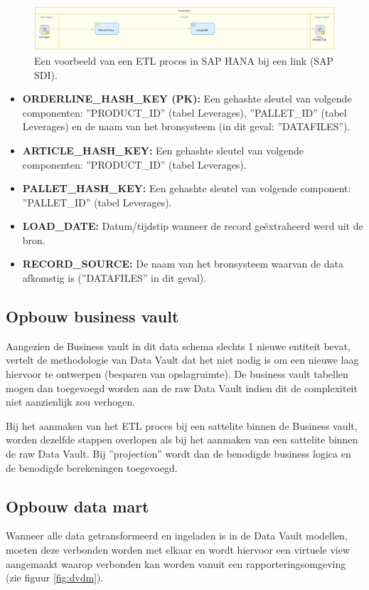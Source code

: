 \begin{figure}[h]
	\centering
	\includegraphics[scale=0.45]{../images/DV_FG_link.png}
	\caption{Een voorbeeld van een ETL proces in SAP HANA bij een link (SAP SDI).}
	\label{fig:etllink}
\end{figure}

\begin{itemize}
	\item \textbf{ORDERLINE\_HASH\_KEY (PK):} Een gehashte sleutel van volgende componenten: ''PRODUCT\_ID'' (tabel Leverages), ''PALLET\_ID'' (tabel Leverages)  en de naam van het bronsysteem (in dit geval: ''DATAFILES'').
	\item \textbf{ARTICLE\_HASH\_KEY:} Een gehashte sleutel van volgende componenten: ''PRODUCT\_ID'' (tabel Leverages).
	\item \textbf{PALLET\_HASH\_KEY:} Een gehashte sleutel van volgende component: ''PALLET\_ID'' (tabel Leverages).
	\item \textbf{LOAD\_DATE:} Datum/tijdstip wanneer de record geëxtraheerd werd uit de bron.
	\item \textbf{RECORD\_SOURCE:} De naam van het bronsysteem waarvan de data afkomstig is (''DATAFILES'' in dit geval).
\end{itemize}

\subsection{Opbouw business vault}
Aangezien de Business vault in dit data schema slechts 1 nieuwe entiteit bevat, vertelt de methodologie van Data Vault dat het niet nodig is om een nieuwe laag hiervoor te ontwerpen (besparen van opslagruimte). De business vault tabellen mogen dan toegevoegd worden aan de raw Data Vault indien dit de complexiteit niet aanzienlijk zou verhogen.

Bij het aanmaken van het ETL proces bij een sattelite binnen de Business vault, worden dezelfde stappen overlopen als bij het aanmaken van een sattelite binnen de raw Data Vault. Bij ''projection'' wordt dan de benodigde business logica en de benodigde berekeningen toegevoegd.

\subsection{Opbouw data mart}
Wanneer alle data getransformeerd en ingeladen is in de Data Vault modellen, moeten deze verbonden worden met elkaar en wordt hiervoor een virtuele view aangemaakt waarop verbonden kan worden vanuit een rapporteringsomgeving (zie figuur \ref{fig:dvdm}).

